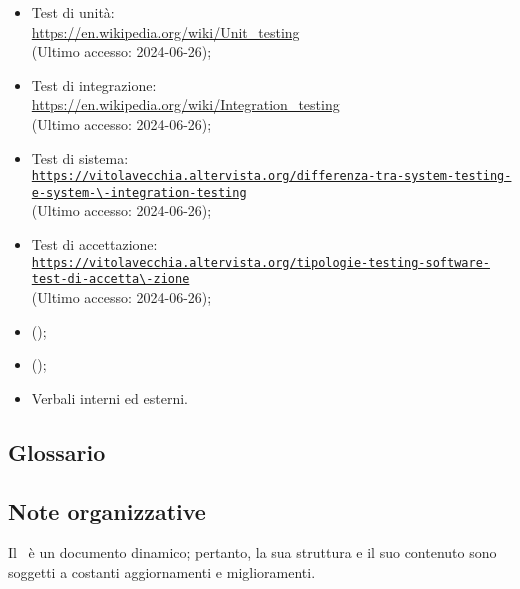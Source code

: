 \begin{itemize}
  \item Test di unità: \\ \href{https://en.wikipedia.org/wiki/Unit_testing}{https://en.wikipedia.org/wiki/Unit\_testing}  \\ (Ultimo accesso: 2024-06-26);
  \item Test di integrazione: \\ \href{https://en.wikipedia.org/wiki/Integration_testing}{https://en.wikipedia.org/wiki/Integration\_testing}  \\ (Ultimo accesso: 2024-06-26);
  \item Test di sistema: \\ \href{https://vitolavecchia.altervista.org/differenza-tra-system-testing-e-system-integration-testing}{\nolinkurl{https://vitolavecchia.altervista.org/differenza-tra-system-testing-e-system-\-integration-testing}}  \\ (Ultimo accesso: 2024-06-26);
  \item Test di accettazione: \\ \href{https://vitolavecchia.altervista.org/tipologie-testing-software-test-di-accettazione}{\nolinkurl{https://vitolavecchia.altervista.org/tipologie-testing-software-test-di-accetta\-zione}}  \\ (Ultimo accesso: 2024-06-26);
  \item (\Glossario);
  \item (\PianoDiProgetto);
  \item Verbali interni ed esterni.
\end{itemize}

\subsection{Glossario} 
\GlossarioIntroduzione

\subsection{Note organizzative}
Il \PdQ\ è un documento dinamico; pertanto, la sua struttura e il suo contenuto sono soggetti a costanti aggiornamenti e miglioramenti.